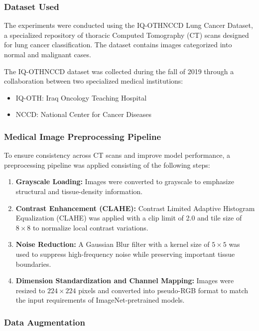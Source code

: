 \subsubsection{Dataset Used}

The experiments were conducted using the IQ-OTHNCCD Lung Cancer Dataset, a specialized repository of thoracic Computed Tomography (CT) scans designed for lung cancer classification. The dataset contains images categorized into normal and malignant cases.

The IQ-OTHNCCD dataset was collected during the fall of 2019 through a collaboration between two specialized medical institutions:

\begin{itemize}
	\item IQ-OTH: Iraq Oncology Teaching Hospital
	\item NCCD: National Center for Cancer Diseases
\end{itemize}

\subsubsection{Medical Image Preprocessing Pipeline}

To ensure consistency across CT scans and improve model performance, a preprocessing pipeline was applied consisting of the following steps:

\begin{enumerate}
	\item \textbf{Grayscale Loading:} Images were converted to grayscale to emphasize structural and tissue-density information.
	\item \textbf{Contrast Enhancement (CLAHE):} Contrast Limited Adaptive Histogram Equalization (CLAHE) was applied with a clip limit of 2.0 and tile size of $8 \times 8$ to normalize local contrast variations.
	
	\item \textbf{Noise Reduction:} A Gaussian Blur filter with a kernel size of $5 \times 5$ was used to suppress high-frequency noise while preserving important tissue boundaries.
	
	\item \textbf{Dimension Standardization and Channel Mapping:} Images were resized to $224 \times 224$ pixels and converted into pseudo-RGB format to match the input requirements of ImageNet-pretrained models.
\end{enumerate}

\subsubsection{Data Augmentation}

